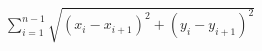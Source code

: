 \documentclass[preview]{standalone}
\begin{document}
\begin{align*}
\sum_{i=1}^{n-1} \sqrt{(x_i - x_{i+1})^2 + (y_i - y_{i+1})^2}
\end{align*}
\end{document}
